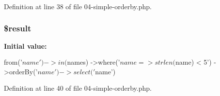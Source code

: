 \-Definition at line 38 of file 04-\/simple-\/orderby.\-php.

\hypertarget{_linq_to_objects_204-simple-orderby_8php_a112ef069ddc0454086e3d1e6d8d55d07}{
\subsubsection[{\$result}]{\setlength{\rightskip}{0pt plus 5cm}\$result}}\label{_linq_to_objects_204-simple-orderby_8php_a112ef069ddc0454086e3d1e6d8d55d07}
{\bfseries \-Initial value\-:}
\begin{DoxyCode}
 from('$name')->in($names)
                        ->where('$name => strlen($name) < 5')
                        ->orderBy('$name')
                        ->select('$name')
\end{DoxyCode}


\-Definition at line 40 of file 04-\/simple-\/orderby.\-php.

